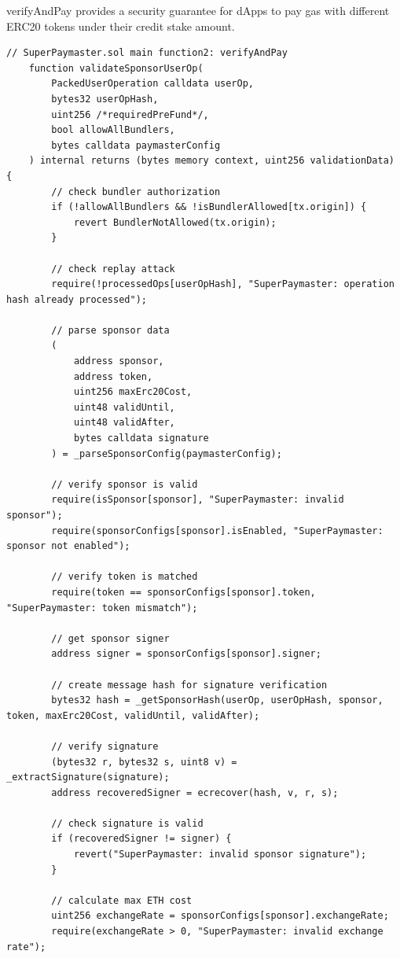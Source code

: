 \documentclass[preprint,12pt]{elsarticle}
\begin{document}
verifyAndPay provides a security guarantee for dApps to pay gas with different ERC20 tokens under their credit stake amount.

\begin{verbatim}
// SuperPaymaster.sol main function2: verifyAndPay
    function validateSponsorUserOp(
        PackedUserOperation calldata userOp,
        bytes32 userOpHash,
        uint256 /*requiredPreFund*/,
        bool allowAllBundlers,
        bytes calldata paymasterConfig
    ) internal returns (bytes memory context, uint256 validationData) {
        // check bundler authorization
        if (!allowAllBundlers && !isBundlerAllowed[tx.origin]) {
            revert BundlerNotAllowed(tx.origin);
        }
    
        // check replay attack
        require(!processedOps[userOpHash], "SuperPaymaster: operation hash already processed");
    
        // parse sponsor data
        (
            address sponsor,
            address token,
            uint256 maxErc20Cost,
            uint48 validUntil,
            uint48 validAfter,
            bytes calldata signature
        ) = _parseSponsorConfig(paymasterConfig);
        
        // verify sponsor is valid
        require(isSponsor[sponsor], "SuperPaymaster: invalid sponsor");
        require(sponsorConfigs[sponsor].isEnabled, "SuperPaymaster: sponsor not enabled");
        
        // verify token is matched
        require(token == sponsorConfigs[sponsor].token, "SuperPaymaster: token mismatch");
        
        // get sponsor signer
        address signer = sponsorConfigs[sponsor].signer;
        
        // create message hash for signature verification
        bytes32 hash = _getSponsorHash(userOp, userOpHash, sponsor, token, maxErc20Cost, validUntil, validAfter);
        
        // verify signature
        (bytes32 r, bytes32 s, uint8 v) = _extractSignature(signature);
        address recoveredSigner = ecrecover(hash, v, r, s);
        
        // check signature is valid
        if (recoveredSigner != signer) {
            revert("SuperPaymaster: invalid sponsor signature");
        }
        
        // calculate max ETH cost
        uint256 exchangeRate = sponsorConfigs[sponsor].exchangeRate;
        require(exchangeRate > 0, "SuperPaymaster: invalid exchange rate");
        

\end{verbatim}
\end{document}
